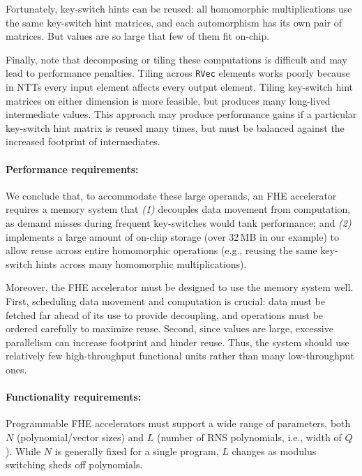 Fortunately, key-switch hints can be reused:
all homomorphic multiplications use the same key-switch hint matrices,
and each automorphism has its own pair of matrices.
But values are so large that few of them fit on-chip.

Finally, note that decomposing or tiling these computations is difficult and may lead to performance penalties. Tiling across \texttt{RVec} elements works poorly because in NTTs every input element affects every output element. Tiling key-switch hint matrices on either dimension is more feasible, but produces many long-lived intermediate values. This approach may produce performance gains if a particular key-switch hint matrix is reused many times, but must be balanced against the increased footprint of intermediates.



\paragraph{Performance requirements:}
We conclude that, to accommodate these large operands, an FHE accelerator requires a memory system that
\emph{(1)} decouples data movement from computation, as demand misses
during frequent key-switches would tank performance; and
\emph{(2)} implements a large amount of on-chip storage (over 32\,MB in our example)
to allow reuse across entire homomorphic operations
(e.g., reusing the same key-switch hints across many homomorphic multiplications).

Moreover, the FHE accelerator must be designed to use the memory system well.
First, scheduling data movement and computation is crucial: data must be fetched far ahead of its use to provide decoupling,
and operations must be ordered carefully to maximize reuse.
Second, since values are large, excessive parallelism can increase footprint and hinder reuse.
Thus, the system should use relatively few high-throughput functional units rather than many low-throughput ones.

\paragraph{Functionality requirements:}
Programmable FHE accelerators must support a wide range of parameters, both $N$ (polynomial/vector sizes)
and $L$ (number of RNS polynomials, i.e., width of $Q$). While $N$ is generally fixed for a single program,
$L$ changes as modulus switching sheds off polynomials.

